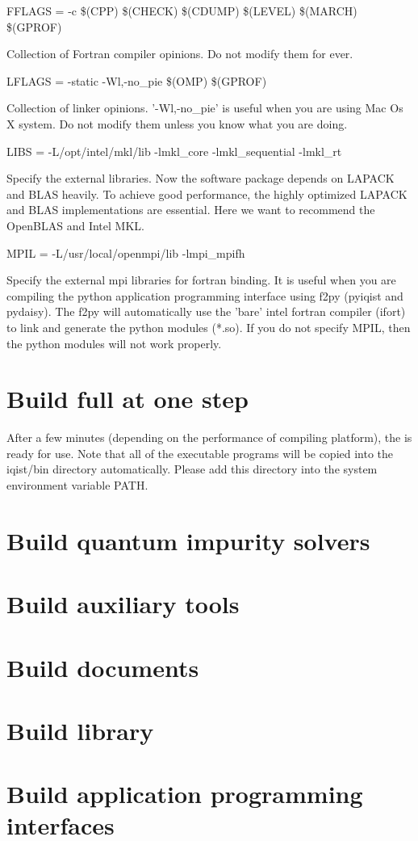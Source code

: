 {\color{red}FFLAGS = -c \$(CPP) \$(CHECK) \$(CDUMP) \$(LEVEL) \$(MARCH) \$(GPROF)}

Collection of Fortran compiler opinions. Do not modify them for ever.

{\color{red}LFLAGS = -static -Wl,-no\_pie \$(OMP) \$(GPROF)}

Collection of linker opinions. '-Wl,-no\_pie' is useful when you are using Mac Os X system. Do not modify them unless you know what you are doing.

{\color{red}LIBS   = -L/opt/intel/mkl/lib -lmkl\_core -lmkl\_sequential -lmkl\_rt}

Specify the external libraries. Now the {\iqist} software package depends on LAPACK and BLAS heavily. To achieve good performance, the highly optimized LAPACK and BLAS implementations are essential. Here we want to recommend the OpenBLAS and Intel MKL.

{\color{red}MPIL   = -L/usr/local/openmpi/lib -lmpi\_mpifh}

Specify the external mpi libraries for fortran binding. It is useful when you are compiling the python application programming interface using f2py (pyiqist and pydaisy). The f2py will automatically use the 'bare' intel fortran compiler (ifort) to link and generate the python modules (*.so). If you do not specify MPIL, then the python modules will not work properly. 

\section{Build full {\iqist} at one step}
After a few minutes (depending on the performance of compiling platform), the {\iqist} is ready for use. Note that all of the executable programs will be copied into the iqist/bin directory automatically. Please add this directory into the system environment variable PATH.
\section{Build quantum impurity solvers}
\section{Build auxiliary tools}
\section{Build documents}
\section{Build library}
\section{Build application programming interfaces}
